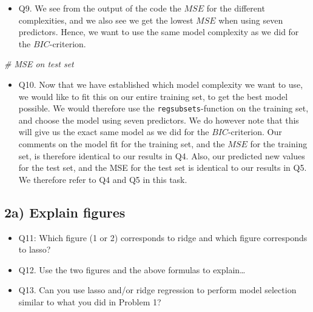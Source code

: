 \documentclass[]{article}
\newenvironment{Shaded}{\begin{snugshade}}{\end{snugshade}}
\newcommand{\CommentTok}[1]{\textcolor[rgb]{0.56,0.35,0.01}{\textit{#1}}}
\providecommand{\tightlist}{%
  \setlength{\itemsep}{0pt}\setlength{\parskip}{0pt}}
\begin{document}
\begin{itemize}
\tightlist
\item
  Q9. We see from the output of the code the \(MSE\) for the different
  complexities, and we also see we get the lowest \(MSE\) when using
  seven predictors. Hence, we want to use the same model complexity as
  we did for the \(BIC\)-criterion.
\end{itemize}

\begin{Shaded}
\begin{Highlighting}[]
\CommentTok{# MSE on test set}
\end{Highlighting}
\end{Shaded}

\begin{itemize}
\tightlist
\item
  Q10. Now that we have established which model complexity we want to
  use, we would like to fit this on our entire training set, to get the
  best model possible. We would therefore use the
  \texttt{regsubsets}-function on the training set, and choose the model
  using seven predictors. We do however note that this will give us the
  exact same model as we did for the \(BIC\)-criterion. Our comments on
  the model fit for the training set, and the \(MSE\) for the training
  set, is therefore identical to our results in Q4. Also, our predicted
  new values for the test set, and the MSE for the test set is identical
  to our results in Q5. We therefore refer to Q4 and Q5 in this task.
\end{itemize}

\subsection{2a) Explain figures}\label{a-explain-figures}

\begin{itemize}
\tightlist
\item
  Q11: Which figure (1 or 2) corresponds to ridge and which figure
  corresponds to lasso?
\item
  Q12. Use the two figures and the above formulas to explain\ldots{}
\item
  Q13. Can you use lasso and/or ridge regression to perform model
  selection similar to what you did in Problem 1?
\end{itemize}
\end{document}
